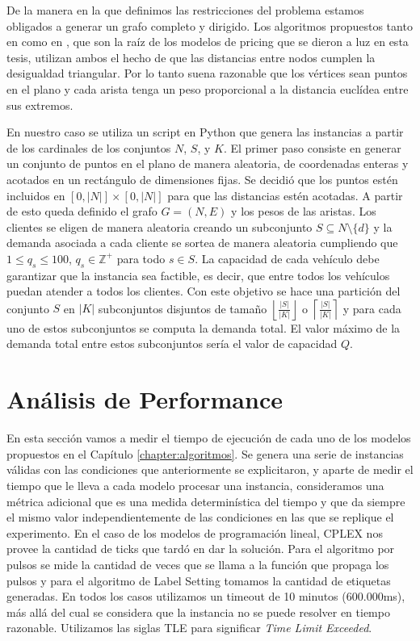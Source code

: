 De la manera en la que definimos las restricciones del problema estamos obligados a generar un grafo completo y dirigido. Los algoritmos propuestos tanto en \cite{lozano-duque-medaglia} como en \cite{righini-salani}, que son la raíz de los modelos de pricing que se dieron a luz en esta tesis, utilizan ambos el hecho de que las distancias entre nodos cumplen la desigualdad triangular. Por lo tanto suena razonable que los vértices sean puntos en el plano y cada arista tenga un peso proporcional a la distancia euclídea entre sus extremos. 

En nuestro caso se utiliza un script en Python que genera las instancias a partir de los cardinales de los conjuntos $N$, $S$, y $K$. El primer paso consiste en generar un conjunto de puntos en el plano de manera aleatoria, de coordenadas enteras y acotados en un rectángulo de dimensiones fijas. Se decidió que los puntos estén incluidos en $[0, |N|] \times [0, |N|]$ para que las distancias estén acotadas. A partir de esto queda definido el grafo $G = (N, E)$ y los pesos de las aristas. Los clientes se eligen de manera aleatoria creando un subconjunto $S \subseteq N \setminus \{d\}$ y la demanda asociada a cada cliente se sortea de manera aleatoria cumpliendo que $1 \leq q_s \leq 100$, $q_s \in \mathbb{Z}^{+}$ para todo $s \in S$. La capacidad de cada vehículo debe garantizar que la instancia sea factible, es decir, que entre todos los vehículos puedan atender a todos los clientes. Con este objetivo se hace una partición del conjunto $S$ en $|K|$ subconjuntos disjuntos de tamaño $\left\lfloor \frac{|S|}{|K|} \right\rfloor$ o $\left\lceil \frac{|S|}{|K|} \right\rceil$ y para cada uno de estos subconjuntos se computa la demanda total. El valor máximo de la demanda total entre estos subconjuntos sería el valor de capacidad $Q$.

\section{Análisis de Performance}
\label{section:performance}

En esta sección vamos a medir el tiempo de ejecución de cada uno de los modelos propuestos en el Capítulo \ref{chapter:algoritmos}. Se genera una serie de instancias válidas con las condiciones que anteriormente se explicitaron, y aparte de medir el tiempo que le lleva a cada modelo procesar una instancia, consideramos una métrica adicional que es una medida determinística del tiempo y que da siempre el mismo valor independientemente de las condiciones en las que se replique el experimento. En el caso de los modelos de programación lineal, CPLEX nos provee la cantidad de ticks que tardó en dar la solución. Para el algoritmo por pulsos se mide la cantidad de veces que se llama a la función que propaga los pulsos y para el algoritmo de Label Setting tomamos la cantidad de etiquetas generadas. En todos los casos utilizamos un timeout de 10 minutos (600.000ms), más allá del cual se considera que la instancia no se puede resolver en tiempo razonable. Utilizamos las siglas TLE para significar \textit{Time Limit Exceeded}. 

